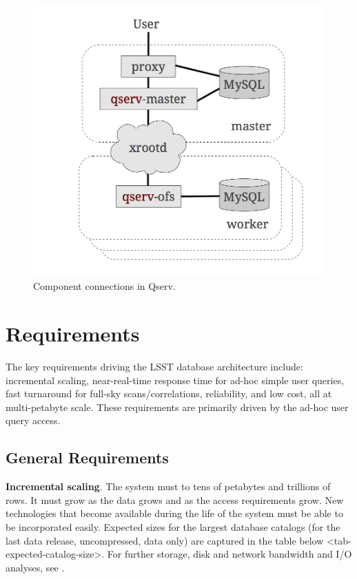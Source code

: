 \documentclass[DM,lsstdraft,toc]{lsstdoc}
\begin{document}
\begin{figure}[H]
\centering
\includegraphics{_static/qserve_components.png}
\caption{Component connections in Qserv.}
\end{figure}

\section{Requirements}\label{requirements}

The key requirements driving the LSST database architecture include:
incremental scaling, near-real-time response time for ad-hoc simple user
queries, fast turnaround for full-sky scans/correlations, reliability,
and low cost, all at multi-petabyte scale. These requirements are
primarily driven by the ad-hoc user query access.

\subsection{General Requirements}\label{general-requirements}

\textbf{Incremental scaling}. The system must to tens of petabytes and
trillions of rows. It must grow as the data grows and as the access
requirements grow. New technologies that become available during the
life of the system must be able to be incorporated easily. Expected
sizes for the largest database catalogs (for the last data release,
uncompressed, data only) are captured in
the table below \textless{}tab-expected-catalog-size\textgreater{}. For
further storage, disk and network bandwidth and I/O analyses, see
.
\end{document}
